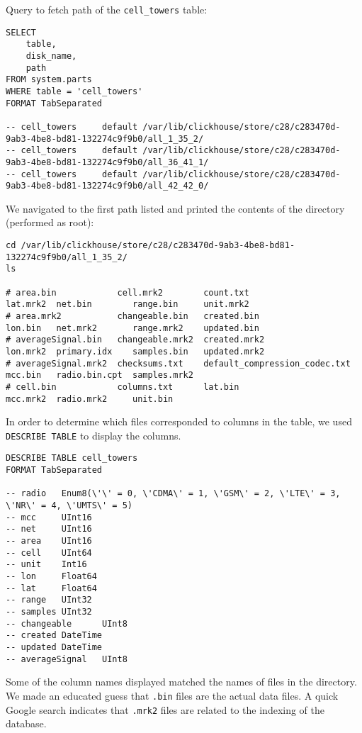 Query to fetch path of the \texttt{cell\_towers} table:
\begin{verbatim}
SELECT
    table,
    disk_name,
    path
FROM system.parts
WHERE table = 'cell_towers'
FORMAT TabSeparated

-- cell_towers     default /var/lib/clickhouse/store/c28/c283470d-9ab3-4be8-bd81-132274c9f9b0/all_1_35_2/
-- cell_towers     default /var/lib/clickhouse/store/c28/c283470d-9ab3-4be8-bd81-132274c9f9b0/all_36_41_1/
-- cell_towers     default /var/lib/clickhouse/store/c28/c283470d-9ab3-4be8-bd81-132274c9f9b0/all_42_42_0/
\end{verbatim}

We navigated to the first path listed and printed the contents of the directory (performed as root):
\begin{verbatim}
cd /var/lib/clickhouse/store/c28/c283470d-9ab3-4be8-bd81-132274c9f9b0/all_1_35_2/
ls

# area.bin            cell.mrk2        count.txt                      lat.mrk2  net.bin        range.bin     unit.mrk2
# area.mrk2           changeable.bin   created.bin                    lon.bin   net.mrk2       range.mrk2    updated.bin
# averageSignal.bin   changeable.mrk2  created.mrk2                   lon.mrk2  primary.idx    samples.bin   updated.mrk2
# averageSignal.mrk2  checksums.txt    default_compression_codec.txt  mcc.bin   radio.bin.cpt  samples.mrk2
# cell.bin            columns.txt      lat.bin                        mcc.mrk2  radio.mrk2     unit.bin
\end{verbatim}

In order to determine which files corresponded to columns in the table,
we used \texttt{DESCRIBE TABLE} to display the columns.

\begin{verbatim}
DESCRIBE TABLE cell_towers
FORMAT TabSeparated

-- radio   Enum8(\'\' = 0, \'CDMA\' = 1, \'GSM\' = 2, \'LTE\' = 3, \'NR\' = 4, \'UMTS\' = 5)
-- mcc     UInt16
-- net     UInt16
-- area    UInt16
-- cell    UInt64
-- unit    Int16
-- lon     Float64
-- lat     Float64
-- range   UInt32
-- samples UInt32
-- changeable      UInt8
-- created DateTime
-- updated DateTime
-- averageSignal   UInt8
\end{verbatim}

Some of the column names displayed matched the names of files in the directory.
We made an educated guess that \texttt{.bin} files are the actual data files.
A quick Google search indicates that \texttt{.mrk2} files are related to the indexing of the database.

